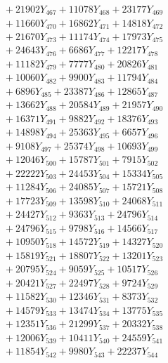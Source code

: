 \documentclass[a4paper,10pt]{article}
\begin{document}
{\begin{align}
&\;  + 21902 Y_{467} + 11078 Y_{468} + 23177 Y_{469} \\[0.3ex]
&\;  + 11660 Y_{470} + 16862 Y_{471} + 14818 Y_{472} \\[0.3ex]
&\;  + 21670 Y_{473} + 11174 Y_{474} + 17973 Y_{475} \\[0.3ex]
&\;  + 24643 Y_{476} + 6686 Y_{477} + 12217 Y_{478} \\[0.5ex]\allowbreak
&\;  + 11182 Y_{479} + 7777 Y_{480} + 20826 Y_{481} \\[0.3ex]
&\;  + 10060 Y_{482} + 9900 Y_{483} + 11794 Y_{484} \\[0.3ex]
&\;  + 6896 Y_{485} + 23387 Y_{486} + 12865 Y_{487} \\[0.3ex]
&\;  + 13662 Y_{488} + 20584 Y_{489} + 21957 Y_{490} \\[0.3ex]
&\;  + 16371 Y_{491} + 9882 Y_{492} + 18376 Y_{493} \\[0.3ex]
&\;  + 14898 Y_{494} + 25363 Y_{495} + 6657 Y_{496} \\[0.3ex]
&\;  + 9108 Y_{497} + 25374 Y_{498} + 10693 Y_{499} \\[0.3ex]
&\;  + 12046 Y_{500} + 15787 Y_{501} + 7915 Y_{502} \\[0.3ex]
&\;  + 22222 Y_{503} + 24453 Y_{504} + 15334 Y_{505} \\[0.3ex]
&\;  + 11284 Y_{506} + 24085 Y_{507} + 15721 Y_{508} \\[0.5ex]\allowbreak
&\;  + 17723 Y_{509} + 13598 Y_{510} + 24068 Y_{511} \\[0.3ex]
&\;  + 24427 Y_{512} + 9363 Y_{513} + 24796 Y_{514} \\[0.3ex]
&\;  + 24796 Y_{515} + 9798 Y_{516} + 14566 Y_{517} \\[0.3ex]
&\;  + 10950 Y_{518} + 14572 Y_{519} + 14327 Y_{520} \\[0.3ex]
&\;  + 15819 Y_{521} + 18807 Y_{522} + 13201 Y_{523} \\[0.3ex]
&\;  + 20795 Y_{524} + 9059 Y_{525} + 10517 Y_{526} \\[0.3ex]
&\;  + 20421 Y_{527} + 22497 Y_{528} + 9724 Y_{529} \\[0.3ex]
&\;  + 11582 Y_{530} + 12346 Y_{531} + 8373 Y_{532} \\[0.3ex]
&\;  + 14579 Y_{533} + 13474 Y_{534} + 13775 Y_{535} \\[0.3ex]
&\;  + 12351 Y_{536} + 21299 Y_{537} + 20332 Y_{538} \\[0.5ex]\allowbreak
&\;  + 12006 Y_{539} + 10411 Y_{540} + 24559 Y_{541} \\[0.3ex]
&\;  + 11854 Y_{542} + 9980 Y_{543} + 22237 Y_{544} \\[0.3ex]

\end{align}}
\end{document}
